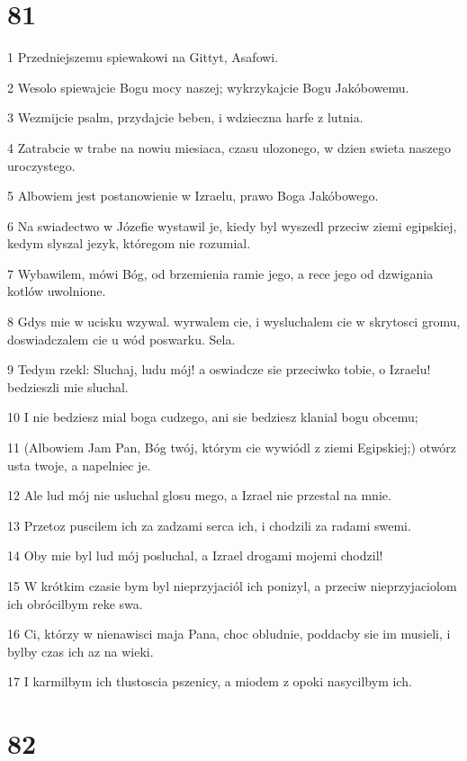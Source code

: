 \chapter{81}

\par 1 Przedniejszemu spiewakowi na Gittyt, Asafowi.
\par 2 Wesolo spiewajcie Bogu mocy naszej; wykrzykajcie Bogu Jakóbowemu.
\par 3 Wezmijcie psalm, przydajcie beben, i wdzieczna harfe z lutnia.
\par 4 Zatrabcie w trabe na nowiu miesiaca, czasu ulozonego, w dzien swieta naszego uroczystego.
\par 5 Albowiem jest postanowienie w Izraelu, prawo Boga Jakóbowego.
\par 6 Na swiadectwo w Józefie wystawil je, kiedy byl wyszedl przeciw ziemi egipskiej, kedym slyszal jezyk, któregom nie rozumial.
\par 7 Wybawilem, mówi Bóg, od brzemienia ramie jego, a rece jego od dzwigania kotlów uwolnione.
\par 8 Gdys mie w ucisku wzywal. wyrwalem cie, i wysluchalem cie w skrytosci gromu, doswiadczalem cie u wód poswarku. Sela.
\par 9 Tedym rzekl: Sluchaj, ludu mój! a oswiadcze sie przeciwko tobie, o Izraelu! bedzieszli mie sluchal.
\par 10 I nie bedziesz mial boga cudzego, ani sie bedziesz klanial bogu obcemu;
\par 11 (Albowiem Jam Pan, Bóg twój, którym cie wywiódl z ziemi Egipskiej;) otwórz usta twoje, a napelniec je.
\par 12 Ale lud mój nie usluchal glosu mego, a Izrael nie przestal na mnie.
\par 13 Przetoz puscilem ich za zadzami serca ich, i chodzili za radami swemi.
\par 14 Oby mie byl lud mój posluchal, a Izrael drogami mojemi chodzil!
\par 15 W krótkim czasie bym byl nieprzyjaciól ich ponizyl, a przeciw nieprzyjaciolom ich obrócilbym reke swa.
\par 16 Ci, którzy w nienawisci maja Pana, choc obludnie, poddacby sie im musieli, i bylby czas ich az na wieki.
\par 17 I karmilbym ich tlustoscia pszenicy, a miodem z opoki nasycilbym ich.

\chapter{82}

